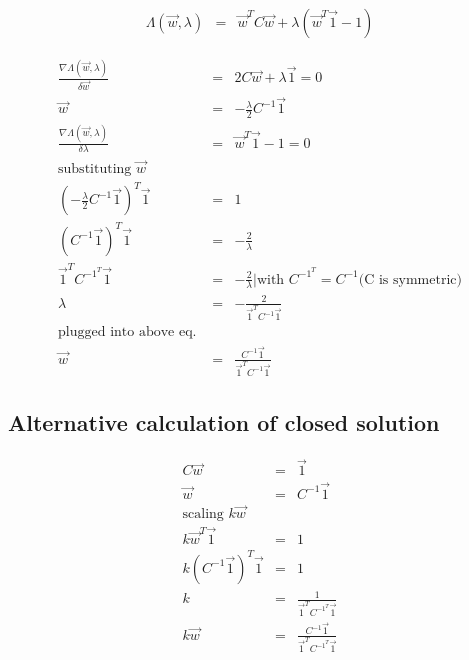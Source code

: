\documentclass{article}
\begin{document}
  \begin{eqnarray*}
    \Lambda(\vec{w},\lambda) &=& \vec{w}^TC\vec{w} + \lambda(\vec{w}^T \vec{1} - 1)
  \end{eqnarray*}

  \begin{eqnarray*}
    \frac{\nabla\Lambda(\vec{w},\lambda)}{\delta\vec{w}} &=& 2 C \vec{w} + \lambda \vec{1} = 0\\
    \vec{w} &=& - \frac{\lambda}{2} C^{-1} \vec{1}\\
    \frac{\nabla\Lambda(\vec{w},\lambda)}{\delta\lambda} &=& \vec{w}^T \vec{1} - 1 = 0\\
    \text{substituting } \vec{w}&&\\
    (- \frac{\lambda}{2} C^{-1} \vec{1})^T \vec{1} &=& 1\\
    (C^{-1} \vec{1})^T \vec{1} &=& - \frac{2}{\lambda}\\
    \vec{1}^T C^{-1^T} \vec{1} &=& - \frac{2}{\lambda} \Big\vert \text{with } C^{-1^T} = C^{-1} \text{(C is symmetric)}\\
    \lambda &=& -\frac{2}{\vec{1}^T C^{-1} \vec{1}}\\
    \text{plugged into above eq. }&&\\
    \vec{w} &=& \frac{C^{-1} \vec{1}}{\vec{1}^T C^{-1} \vec{1}}
  \end{eqnarray*}

\subsection{Alternative calculation of closed solution}

  \begin{eqnarray*}
    C \vec{w} &=& \vec{1}\\
    \vec{w} &=& C^{-1} \vec{1}\\
    \text{scaling } k \vec{w}&&\\
    k \vec{w}^T \vec{1} &=& 1\\
    k (C^{-1} \vec{1})^T \vec{1} &=& 1\\
    k &=& \frac{1}{\vec{1}^T C^{-1^T} \vec{1}}\\
    k \vec{w} &=& \frac{C^{-1} \vec{1}}{\vec{1}^T C^{-1^T} \vec{1}}
  \end{eqnarray*}
\end{document}
